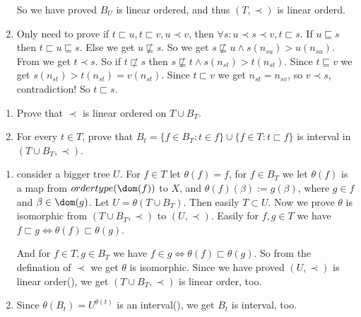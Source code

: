 \documentclass{ctexart}
\begin{document}
\begin{solution}
\begin{enumerate}
      So we have proved \(B_U\) is linear ordered, and thus \((T,\prec)\) is linear orderd. 
    \item Only need to prove if \(t \sqsubset u,t \sqsubset v,u \prec v\), then \(\forall s:u \prec s \prec v,t \sqsubset s\). 
      If \(u \sqsubseteq s\) then \(t \sqsubset u \sqsubseteq s\). 
      Else we get \(u \not \sqsubseteq s\). So we get \(s \not \sqsubseteq u \wedge s(n_{su})>u(n_{su})\). 
      From  we get \(t \prec s\). So if \(t \not \sqsubset s \) then \(s \not \sqsubseteq t \wedge s(n_{st})>t(n_{st})\). 
      Since \(t \sqsubseteq v\) we get \(s(n_{st})>t(n_{st})=v(n_{st})\). 
      Since \(t \sqsubset v\) we get \(n_{st}=n_{sv}\), so \(v \prec s\), contradiction! 
      So \(t \sqsubset s\). 
  \end{enumerate}
\end{solution}

\begin{problem}
  \begin{enumerate}
    \item Prove that \(\prec\) is linear ordered on \(T \cup B_T\). 
    \item For every \(t \in T\), prove that \(B_t = \{f \in B_T:t \in f\}\cup\{f \in T:t \sqsubset f\}\) is interval in \((T \cup B_T,\prec)\). 
  \end{enumerate}
\end{problem}

\begin{solution}
  \begin{enumerate}
    \item consider a bigger tree \(U\). For \(f \in T\) let \(\theta(f)= f\), for \(f \in B_T\) we let \(\theta(f)\) is a map 
      from \(ordertype(\dom(f))\) to \(X\), and \(\theta(f)(\beta):=g(\beta)\), where \(g \in f \) and \(\beta \in \dom(g)\). 
      Let \(U=\theta(T \cup B_T)\). Then easily \(T \subset U\). Now we prove \(\theta\) is isomorphic from \((T \cup B_T,\prec)\) to \((U,\prec)\). 
      Easily for \(f,g \in T\) we have \(f \sqsubset g \iff \theta(f) \sqsubset \theta(g)\). 
 
      And for \(f \in T,g \in B_T\) we have \(f \in g \iff \theta(f)\sqsubset \theta(g)\). 
      So from the defination of \(\prec\) we get \(\theta\) is isomorphic. 
      Since we have proved \((U,\prec)\) is linear order(), we get \((T \cup B_T,\prec)\) is linear order, too. 
    \item Since \(\theta(B_t)=U^{\theta(t)}\) is an interval(), we get \(B_t\) is interval, too.
  \end{enumerate}
\end{solution}

\begin{problem}
  
\end{problem}
\end{document}
